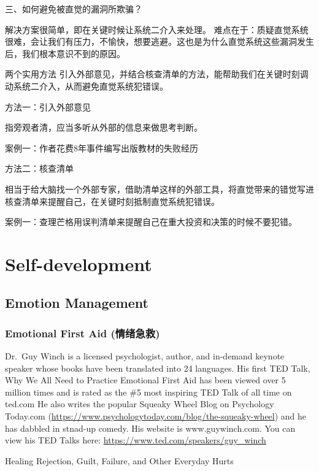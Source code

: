 \documentclass[12pt,]{krantz}
\renewenvironment{quote}{\begin{VF}}{\end{VF}}
\begin{document}
三、如何避免被直觉的漏洞所欺骗？

解决方案很简单，即在关键时候让系统二介入来处理。
难点在于：质疑直觉系统很难，会让我们有压力，不愉快，想要逃避。这也是为什么直觉系统这些漏洞发生后，我们根本意识不到的原因。

两个实用方法
引入外部意见，并结合核查清单的方法，能帮助我们在关键时刻调动系统二介入，从而避免直觉系统犯错误。

方法一：引入外部意见

指旁观者清，应当多听从外部的信息来做思考判断。

案例一：作者花费8年事件编写出版教材的失败经历

方法二：核查清单

相当于给大脑找一个外部专家，借助清单这样的外部工具，将直觉带来的错觉写进核查清单来提醒自己，在关键时刻抵制直觉系统犯错误。

案例一：查理芒格用误判清单来提醒自己在重大投资和决策的时候不要犯错。

\chapter{Self-development}\label{self-development}

\section{Emotion Management}\label{emotion-management}

\subsection{Emotional First Aid (情绪急救)}\label{emotional-first-aid-}

\begin{quote}
Dr.~Guy Winch is a licensed psychologist, author, and in-demand keynote
speaker whose books have been translated into 24 languages. His first
TED Talk, Why We All Need to Practice Emotional First Aid has been
viewed over 5 million times and is rated as the \#5 most inspiring TED
Talk of all time on ted.com He also writes the popular Squeaky Wheel
Blog on Psychology Today.com
(\url{https://www.psychologytoday.com/blog/the-squeaky-wheel}) and he
has dabbled in stnad-up comedy. His website is www.guywinch.com. You can
view his TED Talks here: \url{https://www.ted.com/speakers/guy_winch}
\end{quote}

Healing Rejection, Guilt, Failure, and Other Everyday Hurts
\end{document}
